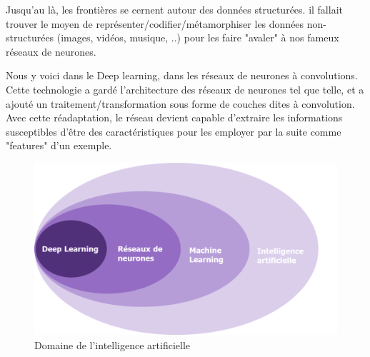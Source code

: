 Jusqu'au là, les frontières se cernent autour des données structurées. il fallait trouver le moyen de représenter/codifier/métamorphiser les données non-structurées (images, vidéos, musique, ..) pour les faire "avaler" à nos fameux réseaux de neurones.

Nous y voici dans le Deep learning, dans les réseaux de neurones à convolutions. Cette technologie a gardé l'architecture des réseaux de neurones tel que  telle, et a ajouté un traitement/transformation sous forme de couches dites à convolution. Avec cette réadaptation, le réseau devient capable d'extraire les informations susceptibles d'être des caractéristiques pour les employer par la suite comme "features" d'un exemple. 
\vspace{1.5cm}
\begin{figure}[H]
\centering
\includegraphics[width=12cm]{figures/AP/image-1-1.png}
\caption{Domaine de l'intelligence artificielle}
\end{figure}
